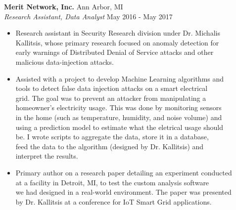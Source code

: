 \documentclass[margin,11pt]{res}
\begin{document}
\begin{resume}
\vspace{-10pt}
\textbf{Merit Network, Inc.} \hfill Ann Arbor, MI\\
\textsl{Research Assistant, Data Analyst} \hfill May 2016 - May 2017
\begin{itemize}
	\itemsep -2pt
    \item Research assistant in Security Research division under Dr. Michalis\\
          Kallitsis, whose primary research focused on anomaly detection for\\
          early warnings of Distributed Denial of Service attacks and other\\
          malicious data-injection attacks.
    \item Assisted with a project to develop Machine Learning algorithms and\\
          tools to detect false data injection attacks on a smart electrical\\
          grid. The goal was to prevent an attacker from manipulating a\\
          homeowner's electricity usage. This was done by monitoring sensors\\
          in the home (such as temperature, humidity, and noise volume) and\\
          using a prediction model to estimate what the eletrical usage should\\
          be. I wrote scripts to aggregate the data, store it in a database,\\
          feed the data to the algorithm (designed by Dr. Kallitsis) and\\
          interpret the results.
    \item Primary author on a research paper detailing an experiment conducted\\
          at a facility in Detroit, MI, to test the custom analysis software\\
          we had designed in a real-world environment. The paper was presented\\
          by Dr. Kallitsis at a conference for IoT Smart Grid applications.
\end{itemize}

\pagebreak


\end{resume}
\end{document}
